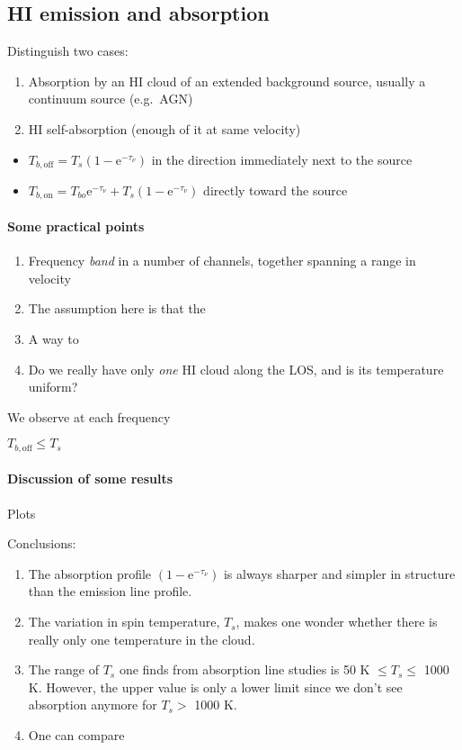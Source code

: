 \documentclass[12pt]{article}
\newcommand{\mar}[1]{\hspace{0pt}\marginpar{-\textcolor{black}{#1}-}}
\begin{document}
\mar{41}
\subsection{HI emission and absorption}
Distinguish two cases:
\begin{enumerate}
    \item Absorption by an HI cloud of an extended background source, usually
        a continuum source (e.g.\ AGN)
    \item HI self-absorption (enough of it at same velocity)
\end{enumerate}

\mar{42}
\begin{itemize}
    \item $T_{b,\mathrm{off}} = T_{s}(1-\mathrm{e}^{-\tau_{\nu}})$
        in the direction immediately next to the source
    \item $T_{b,\mathrm{on}} = T_{bo}\mathrm{e}^{-\tau_{\nu}} +
        T_{s}(1-\mathrm{e}^{-\tau_{\nu}})$
        directly toward the source
\end{itemize}

\paragraph{Some practical points}
\begin{enumerate}
    \item Frequency \emph{band} in a number of channels, together spanning a
        range in velocity
    \item The assumption here is that the
    \item A way to
    \item Do we really have only \emph{one} HI cloud along the LOS, and is
        its temperature uniform?
\end{enumerate}

\mar{43}
We observe at each frequency

\textcolor{bred}{$T_{b,\mathrm{off}} \leq T_{s} $}

\paragraph{Discussion of some results}

\mar{44}
Plots

\mar{45}Conclusions:
\begin{enumerate}
    \item The absorption profile $(1-\mathrm{e}^{-\tau_{\nu}})$ is always
    sharper and simpler in structure than the emission line profile.
    \item \mar{46}The variation in spin temperature, $T_{s}$, makes one
    wonder whether there is really only one temperature in the cloud.
    \item The range of $T_{s}$ one finds from absorption line studies is
        50 K $\leq T_{s} \leq$ 1000 K. However, the upper value is only
        a lower limit since we don't see absorption anymore for
        $T_{s} >$ 1000 K.
    \item One can compare
\end{enumerate}
\end{document}
